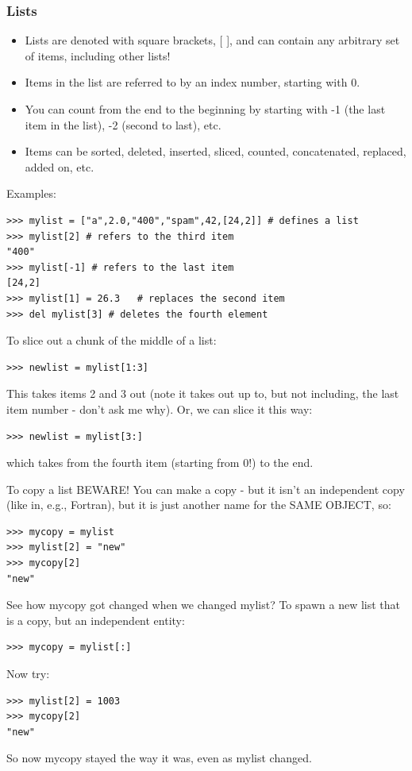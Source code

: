 \documentclass[11pt]{book}
\begin{document}
{{{\subsubsection{Lists}
\begin{itemize}
\item Lists are denoted with square brackets,  [ ],  and can contain any arbitrary set of items, including other lists!
\item Items in the list are referred to by an index number, starting with 0.
\item You can count from the end to the beginning by starting with -1 (the last item in the list), -2 (second to last), etc.
\item Items can be sorted, deleted, inserted, sliced, counted, concatenated, replaced, added on, etc.
\end{itemize}
\noindent
Examples:

{ \color{blue} \begin{verbatim}
>>> mylist = ["a",2.0,"400","spam",42,[24,2]] # defines a list
>>> mylist[2] # refers to the third item
"400"
>>> mylist[-1] # refers to the last item
[24,2]
>>> mylist[1] = 26.3   # replaces the second item
>>> del mylist[3] # deletes the fourth element
\end{verbatim}}


\noindent
To slice out a chunk of the middle of a list:
{ \color{blue} \begin{verbatim}
>>> newlist = mylist[1:3]
\end{verbatim}}
\noindent
This takes items 2 and 3 out (note it takes out up to, but not including, the last item number - don't ask me why).
Or, we can slice it this way:
{ \color{blue} \begin{verbatim}
>>> newlist = mylist[3:]
\end{verbatim}}
\noindent
which takes from the fourth item (starting from 0!) to the end.


To copy a list BEWARE! You can make  a copy - but it isn't an independent copy (like in, e.g.,  Fortran), but it is just another name for the SAME OBJECT, so:
{ \color{blue} \begin{verbatim}
>>> mycopy = mylist
>>> mylist[2] = "new"
>>> mycopy[2]
"new"
\end{verbatim}}
\noindent
See how mycopy got changed when we changed mylist?
\noindent
To spawn a new list that is a copy, but an independent entity:
{ \color{blue} \begin{verbatim}
>>> mycopy = mylist[:]
\end{verbatim}}
\noindent
Now try:
{ \color{blue} \begin{verbatim}
>>> mylist[2] = 1003
>>> mycopy[2]
"new"
\end{verbatim}}
\noindent
So now {\color{blue}mycopy} stayed the way it was, even as {\color{blue}mylist } changed.


}}}
\end{document}
